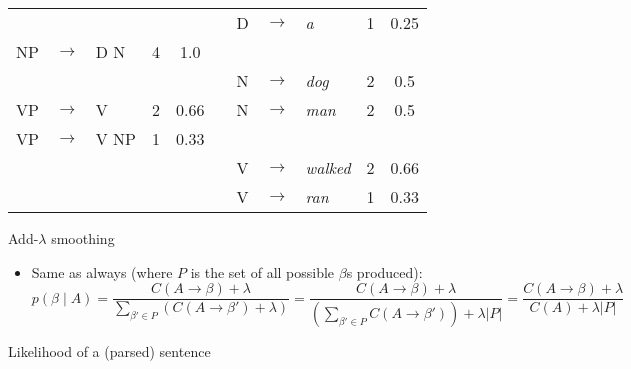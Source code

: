 \documentclass[11pt,letterpaper]{article}
\newcommand{\ra}{\ensuremath{\rightarrow}}
\begin{document}
\begin{itemize}
\begin{center}
\begin{tabular}{lllcc p{13mm} lllcc}
	     &       &          &                &                  &&  D & $\ra$ & \textit{a}        & 1              & 0.25             \\
	  NP & $\ra$ & D N      &  4             & 1.0              &&    &       &                   &                &                  \\
	     &       &          &                &                  &&  N & $\ra$ & \textit{dog}      & 2              & 0.5              \\
	  VP & $\ra$ & V        &  2             & 0.66             &&  N & $\ra$ & \textit{man}      & 2              & 0.5              \\
	  VP & $\ra$ & V NP     &  1             & 0.33             \\
	     &       &          &                &                  &&  V & $\ra$ & \textit{walked}   & 2              & 0.66             \\
	     &       &          &                &                  &&  V & $\ra$ & \textit{ran}      & 1              & 0.33             
	\end{tabular}
	\end{center}
\end{itemize}


Add-$\lambda$ smoothing

\begin{itemize}
  \item Same as always (where $P$ is the set of all possible $\beta$s produced):
    \[ p(\beta \mid A) 
      = \frac{C(A \ra\beta)+\lambda}{\sum_{\beta' \in P} (C(A \ra\beta')+\lambda)} 
      = \frac{C(A \ra\beta)+\lambda}{(\sum_{\beta' \in P} C(A \ra\beta'))+\lambda|P|} 
      = \frac{C(A \ra\beta)+\lambda}{C(A)+\lambda|P|} \]
\end{itemize}


Likelihood of a (parsed) sentence
\end{document}
